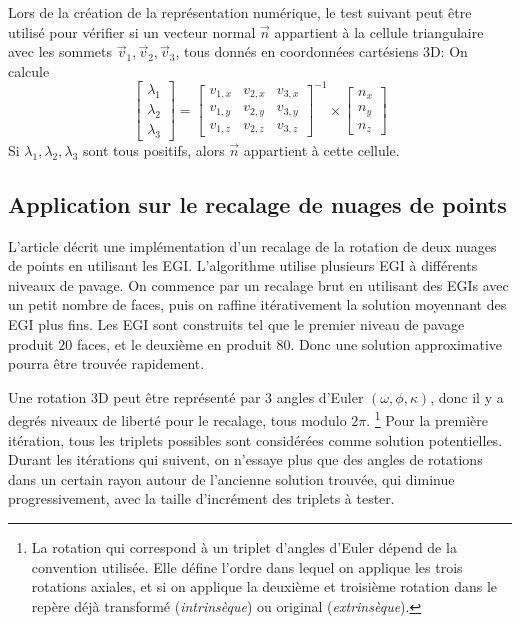 \documentclass[a4paper,10pt]{scrreprt}
\begin{document}
Lors de la création de la représentation numérique, le test suivant peut être utilisé pour vérifier si un vecteur normal $\vec{n}$ appartient à la cellule triangulaire avec les sommets $\vec{v}_1, \vec{v}_2, \vec{v}_3$, tous donnés en coordonnées cartésiens 3D: On calcule
\begin{equation}
	\begin{bmatrix}
		\lambda_1 \\ \lambda_2 \\ \lambda_3
	\end{bmatrix} = \begin{bmatrix}
		v_{1,x} & v_{2,x} & v_{3,x} \\
		v_{1,y} & v_{2,y} & v_{3,y} \\
		v_{1,z} & v_{2,z} & v_{3,z}
	\end{bmatrix}^{-1} \times \begin{bmatrix}
		n_x \\ n_y \\ n_z
	\end{bmatrix}
\end{equation}
Si $\lambda_1, \lambda_2, \lambda_3$ sont tous positifs, alors $\vec{n}$ appartient à cette cellule.


\subsection{Application sur le recalage de nuages de points}
L'article \cite{Dold2005} décrit une implémentation d'un recalage de la rotation de deux nuages de points en utilisant les EGI. L'algorithme utilise plusieurs EGI à différents niveaux de pavage. On commence par un recalage brut en utilisant des EGIs avec un petit nombre de faces, puis on raffine itérativement la solution moyennant des EGI plus fins. Les EGI sont construits tel que le premier niveau de pavage produit $20$ faces, et le deuxième en produit $80$. Donc une solution approximative pourra être trouvée rapidement.

Une rotation 3D peut être représenté par 3 angles d'Euler $(\omega, \phi, \kappa)$, donc il y a degrés niveaux de liberté pour le recalage, tous modulo $2 \pi$.
\footnote{La rotation qui correspond à un triplet d'angles d'Euler dépend de la convention utilisée. Elle défine l'ordre dans lequel on applique les trois rotations axiales, et si on applique la deuxième et troisième rotation dans le repère déjà transformé (\emph{intrinsèque}) ou original (\emph{extrinsèque}).}
Pour la première itération, tous les triplets possibles sont considérées comme solution potentielles. Durant les itérations qui suivent, on n'essaye plus que des angles de rotations dans un certain rayon autour de l'ancienne solution trouvée, qui diminue progressivement, avec la taille d'incrément des triplets à tester.
\end{document}
